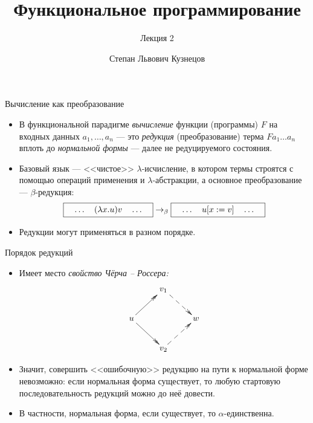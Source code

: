 \documentclass[xcolor=dvipsnames]{beamer}
\begin{document}
\title{Функциональное программирование}
\subtitle{Лекция 2}
\date{}
\author{Степан Львович Кузнецов}

\maketitle

\begin{frame}{Вычисление как преобразование}
 
 \begin{itemize}[<+->]
  \item В функциональной парадигме {\em вычисление} функции (программы) $F$ на входных данных $a_1, \ldots, a_n$ --- это {\em редукция} (преобразование) терма
  $F a_1 \ldots a_n$ вплоть до {\em нормальной формы} --- далее не редуцируемого состояния.
  
  \item Базовый язык --- <<чистое>> $\lambda$-исчисление, в котором термы строятся с помощью операций применения и $\lambda$-абстракции, а основное преобразование --- $\beta$-редукция:
  \[
  \mbox{\fbox{$\quad\ldots\quad (\lambda x.u)v \quad \ldots\quad$}} \to_\beta
  \mbox{\fbox{$\quad\ldots\quad u[x:=v] \quad \ldots\quad$}}
 \]

 \item Редукции могут применяться в разном порядке.
 \end{itemize}

 
\end{frame}

\begin{frame}{Порядок редукций}

\begin{itemize}[<+->]
 \item Имеет место {\em свойство Чёрча -- Россера:}
 \[
  \xymatrix{
   & v_1 \ar@{-->>}[dr] & \\
  u \ar@{->>}[ur]\ar@{->>}[dr] & & w \\
  & v_2 \ar@{-->>}[ur]
  }
 \]
 \item Значит, совершить <<ошибочную>> редукцию на пути к нормальной форме невозможно: если нормальная форма существует, то любую стартовую последовательность редукций можно до неё довести.
 
 \item В частности, нормальная форма, если существует, то $\alpha$-единственна.
\end{itemize}


\end{frame}
\end{document}
